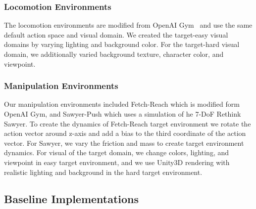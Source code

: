 \subsubsection{\textbf{Locomotion Environments}}
The locomotion environments are modified from OpenAI Gym~\citep{brockman2016openai} and use the same default action space and visual domain. We created the target-easy visual domains by varying lighting and background color.  For the target-hard visual domain, we additionally varied background texture, character color, and viewpoint.

\subsubsection{\textbf{Manipulation Environments}}
Our manipulation environments included Fetch-Reach which is modified form OpenAI Gym, and Sawyer-Push which uses a simulation of he 7-DoF Rethink Sawyer. To create the dynamics of Fetch-Reach target environment we rotate the action vector around z-axis and add a bias to the third coordinate of the action vector. For Sawyer, we vary the friction and mass to create target environment dynamics. For visual of the target domain, we change colors,  lighting, and viewpoint in easy target environment, and we use Unity3D rendering with realistic lighting and background in the hard target environment.


\subsection{Baseline Implementations}
\label{sec:baseline_implementation}



